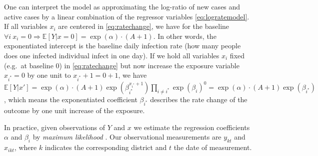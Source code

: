 \documentclass[]{elsarticle} %
\begin{document}
One can interpret the model as approximating the log-ratio of new cases and active cases by a linear combination of the regressor variables \eqref{eq:logratemodel}. If all variables \(x_i\) are centered in \eqref{eq:ratechange}, we have for the baseline \(\forall i\ x_i=0 \Rightarrow \mathbb{E}[Y|x=0]=\exp(\alpha)\cdot (A+1)\). In other words, the exponentiated intercept is the baseline daily infection rate (how many people does one infected individual infect in one day). If we hold all variables \(x_i\) fixed (e.g.~at baseline 0) in \eqref{eq:ratechange} but now increase the exposure variable \(x_{i^{\ast}}=0\) by one unit to \(x_{i^{\ast}}+1=0+1\), we have \(\mathbb{E}[Y|x']=\exp(\alpha)\cdot(A+1)\exp(\beta_{i^{\ast}}^{x_{i^{\ast}}+1})\prod_{i\neq i^{\ast}}\exp(\beta_i)^0=\exp(\alpha)\cdot(A+1)\exp(\beta_{i^{\ast}})\), which means the exponentiated coefficient \(\beta_{i^{\ast}}\) describes the rate change of the outcome by one unit increase of the exposure.

In practice, given observations of \(Y\) and \(x\) we estimate the regression coefficients \(\alpha\) and \(\beta_i\) by \emph{maximum likelihood} \citep{maxlikelihood}. Our observational measurements are \(y_{kt}\) and \(x_{ikt}\), where \(k\) indicates the corresponding district and \(t\) the date of measurement.
\end{document}
